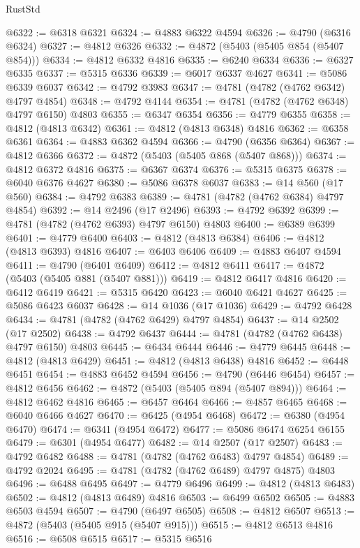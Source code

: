 \begin{lexlean}{RustStd}
\begin{coremodule}
@6322 := @6318 @6321
@6324 := @4883 @6322 @4594
@6326 := @4790 (@6316 @6324)
@6327 := @4812 @6326
@6332 := @4872 (@5403 (@5405 @854 (@5407 @854)))
@6334 := @4812 @6332 @4816
@6335 := @6240 @6334
@6336 := @6327 @6335
@6337 := @5315 @6336
@6339 := @6017 @6337 @4627
@6341 := @5086 @6339 @6037
@6342 := @4792 @3983
@6347 := @4781 (@4782 (@4762 @6342) @4797 @4854)
@6348 := @4792 @4144
@6354 := @4781 (@4782 (@4762 @6348) @4797 @6150) @4803
@6355 := @6347 @6354
@6356 := @4779 @6355
@6358 := @4812 (@4813 @6342)
@6361 := @4812 (@4813 @6348) @4816
@6362 := @6358 @6361
@6364 := @4883 @6362 @4594
@6366 := @4790 (@6356 @6364)
@6367 := @4812 @6366
@6372 := @4872 (@5403 (@5405 @868 (@5407 @868)))
@6374 := @4812 @6372 @4816
@6375 := @6367 @6374
@6376 := @5315 @6375
@6378 := @6040 @6376 @4627
@6380 := @5086 @6378 @6037
@6383 := @14 @560 (@17 @560)
@6384 := @4792 @6383
@6389 := @4781 (@4782 (@4762 @6384) @4797 @4854)
@6392 := @14 @2496 (@17 @2496)
@6393 := @4792 @6392
@6399 := @4781 (@4782 (@4762 @6393) @4797 @6150) @4803
@6400 := @6389 @6399
@6401 := @4779 @6400
@6403 := @4812 (@4813 @6384)
@6406 := @4812 (@4813 @6393) @4816
@6407 := @6403 @6406
@6409 := @4883 @6407 @4594
@6411 := @4790 (@6401 @6409)
@6412 := @4812 @6411
@6417 := @4872 (@5403 (@5405 @881 (@5407 @881)))
@6419 := @4812 @6417 @4816
@6420 := @6412 @6419
@6421 := @5315 @6420
@6423 := @6040 @6421 @4627
@6425 := @5086 @6423 @6037
@6428 := @14 @1036 (@17 @1036)
@6429 := @4792 @6428
@6434 := @4781 (@4782 (@4762 @6429) @4797 @4854)
@6437 := @14 @2502 (@17 @2502)
@6438 := @4792 @6437
@6444 := @4781 (@4782 (@4762 @6438) @4797 @6150) @4803
@6445 := @6434 @6444
@6446 := @4779 @6445
@6448 := @4812 (@4813 @6429)
@6451 := @4812 (@4813 @6438) @4816
@6452 := @6448 @6451
@6454 := @4883 @6452 @4594
@6456 := @4790 (@6446 @6454)
@6457 := @4812 @6456
@6462 := @4872 (@5403 (@5405 @894 (@5407 @894)))
@6464 := @4812 @6462 @4816
@6465 := @6457 @6464
@6466 := @4857 @6465
@6468 := @6040 @6466 @4627
@6470 := @6425 (@4954 @6468)
@6472 := @6380 (@4954 @6470)
@6474 := @6341 (@4954 @6472)
@6477 := @5086 @6474 @6254 @6155
@6479 := @6301 (@4954 @6477)
@6482 := @14 @2507 (@17 @2507)
@6483 := @4792 @6482
@6488 := @4781 (@4782 (@4762 @6483) @4797 @4854)
@6489 := @4792 @2024
@6495 := @4781 (@4782 (@4762 @6489) @4797 @4875) @4803
@6496 := @6488 @6495
@6497 := @4779 @6496
@6499 := @4812 (@4813 @6483)
@6502 := @4812 (@4813 @6489) @4816
@6503 := @6499 @6502
@6505 := @4883 @6503 @4594
@6507 := @4790 (@6497 @6505)
@6508 := @4812 @6507
@6513 := @4872 (@5403 (@5405 @915 (@5407 @915)))
@6515 := @4812 @6513 @4816
@6516 := @6508 @6515
@6517 := @5315 @6516

\end{coremodule}
\end{lexlean}
